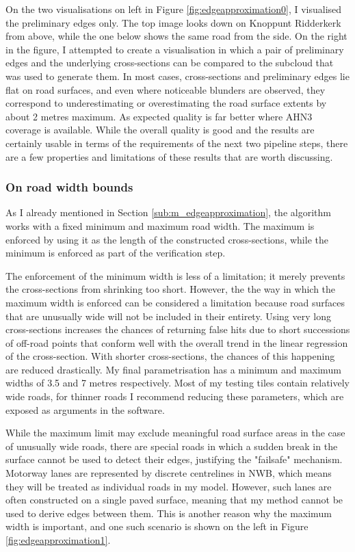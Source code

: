 On the two visualisations on left in Figure \ref{fig:edgeapproximation0}, I visualised the preliminary edges only. The top image looks down on Knoppunt Ridderkerk from above, while the one below shows the same road from the side. On the right in the figure, I attempted to create a visualisation in which a pair of preliminary edges and the underlying cross-sections can be compared to the subcloud that was used to generate them. In most cases, cross-sections and preliminary edges lie flat on road surfaces, and even where noticeable blunders are observed, they correspond to underestimating or overestimating the road surface extents by about 2 metres maximum. As expected quality is far better where AHN3 coverage is available. While the overall quality is good and the results are certainly usable in terms of the requirements of the next two pipeline steps, there are a few properties and limitations of these results that are worth discussing.

\subsubsection{On road width bounds}

As I already mentioned in Section \ref{sub:m_edgeapproximation}, the algorithm works with a fixed minimum and maximum road width. The maximum is enforced by using it as the length of the constructed cross-sections, while the minimum is enforced as part of the verification step.

The enforcement of the minimum width is less of a limitation; it merely prevents the cross-sections from shrinking too short. However, the the way in which the maximum width is enforced can be considered a limitation because road surfaces that are unusually wide will not be included in their entirety. Using very long cross-sections increases the chances of returning false hits due to short successions of off-road points that conform well with the overall trend in the linear regression of the cross-section. With shorter cross-sections, the chances of this happening are reduced drastically. My final parametrisation has a minimum and maximum widths of 3.5 and 7 metres respectively. Most of my testing tiles contain relatively wide roads, for thinner roads I recommend reducing these parameters, which are exposed as arguments in the software.

While the maximum limit may exclude meaningful road surface areas in the case of unusually wide roads, there are special roads in which a sudden break in the surface cannot be used to detect their edges, justifying the "failsafe" mechanism. Motorway lanes are represented by discrete centrelines in NWB, which means they will be treated as individual roads in my model. However, such lanes are often constructed on a single paved surface, meaning that my method cannot be used to derive edges between them. This is another reason why the maximum width is important, and one such scenario is shown on the left in Figure \ref{fig:edgeapproximation1}.

